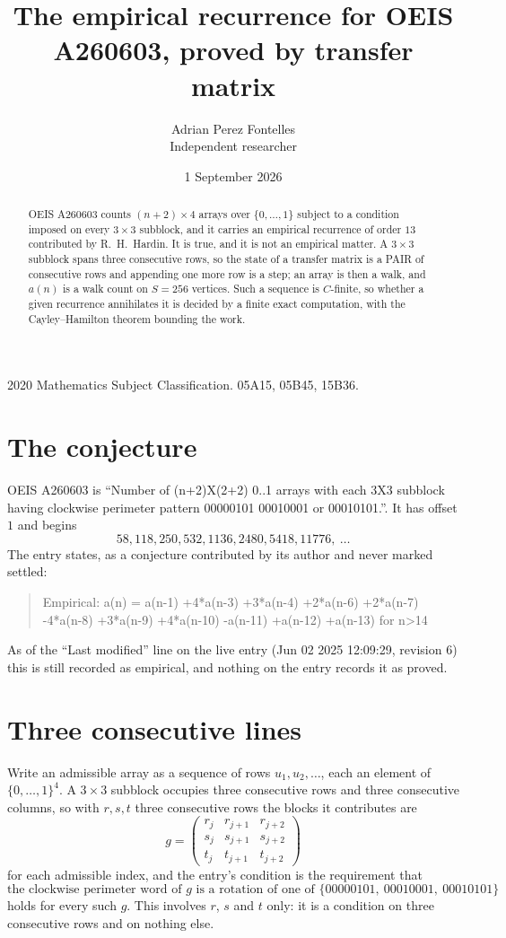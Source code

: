 \documentclass[11pt,a4paper]{article}
\title{The empirical recurrence for OEIS A260603, proved by transfer matrix}
\author{Adrian Perez Fontelles\\ \small Independent researcher}
\date{1 September 2026}
\theoremstyle{plain}
\theoremstyle{definition}
\begin{document}
\maketitle

\begin{abstract}
OEIS A260603 counts $(n+2)\times4$ arrays over $\{0,\dots,1\}$ subject to a condition imposed on
every $3\times3$ subblock, and it carries an empirical recurrence of order $13$
contributed by R.~H.~Hardin. It is true, and it is not an empirical matter. A $3\times3$
subblock spans three consecutive rows, so the state of a transfer matrix is a PAIR of
consecutive rows and appending one more row is a step; an array is then a walk, and
$a(n)$ is a walk count on $S=256$ vertices. Such a sequence is $C$-finite, so whether a given
recurrence annihilates it is decided by a finite exact computation, with the Cayley--Hamilton
theorem bounding the work.
\end{abstract}

\noindent\small 2020 Mathematics Subject Classification. 05A15, 05B45, 15B36.\normalsize

\section{The conjecture}

OEIS A260603 is ``Number of (n+2)X(2+2) 0..1 arrays with each 3X3 subblock having clockwise perimeter pattern 00000101 00010001 or 00010101.''. It has offset $1$ and begins
\[
58, 118, 250, 532, 1136, 2480, 5418, 11776,\ \dots
\]
The entry states, as a conjecture contributed by its author and never marked settled:
\begin{quote}
Empirical: a(n) = a(n-1) +4*a(n-3) +3*a(n-4) +2*a(n-6) +2*a(n-7) -4*a(n-8) +3*a(n-9) +4*a(n-10) -a(n-11) +a(n-12) +a(n-13) for n>14
\end{quote}
As of the ``Last modified'' line on the live entry (Jun 02 2025 12:09:29, revision 6) this is still
recorded as empirical, and nothing on the entry records it as proved.

\section{Three consecutive lines}

Write an admissible array as a sequence of rows $u_1,u_2,\dots$, each an element of
$\{0,\dots,1\}^{4}$. A $3\times3$ subblock occupies three consecutive rows and
three consecutive columns, so with $r,s,t$ three consecutive rows the blocks it
contributes are
\[
g=\begin{pmatrix}r_j&r_{j+1}&r_{j+2}\\ s_j&s_{j+1}&s_{j+2}\\ t_j&t_{j+1}&t_{j+2}\end{pmatrix}
\]
for each admissible index, and the entry's condition is the requirement that
\[
\text{the clockwise perimeter word of }g\text{ is a rotation of one of }\{00000101,\ 00010001,\ 00010101\}
\]
holds for every such $g$. This involves $r$, $s$ and $t$ only: it is a condition on
three consecutive rows and on nothing else.
\end{document}
